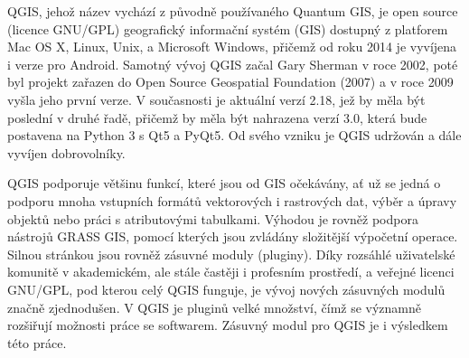 QGIS, jehož název vychází z původně používaného Quantum GIS, je open
source (licence GNU/GPL) geografický informační systém (GIS) dostupný
z platforem Mac OS X, Linux, Unix, a Microsoft Windows, přičemž od
roku 2014 je vyvíjena i verze pro Android. Samotný vývoj QGIS začal
Gary Sherman v roce 2002, poté byl projekt zařazen do Open Source
Geospatial Foundation (2007) a v roce 2009 vyšla jeho první verze. V
současnosti je aktuální verzí 2.18, jež by měla být poslední v druhé
řadě, přičemž by měla být nahrazena verzí 3.0, která bude postavena na
Python 3 s Qt5 a PyQt5. Od svého vzniku je QGIS udržován a dále
vyvíjen dobrovolníky.

QGIS podporuje většinu funkcí, které jsou od GIS očekávány, ať už se
jedná o podporu mnoha vstupních formátů vektorových i rastrových dat,
výběr a úpravy objektů nebo práci s atributovými tabulkami. Výhodou je
rovněž podpora nástrojů GRASS GIS, pomocí kterých jsou zvládány
složitější výpočetní operace.  Silnou stránkou jsou rovněž zásuvné
moduly (pluginy). Díky rozsáhlé uživatelské komunitě v akademickém,
ale stále častěji i profesním prostředí, a veřejné licenci GNU/GPL,
pod kterou celý QGIS funguje, je vývoj nových zásuvných modulů značně
zjednodušen. V QGIS je pluginů velké množství, čímž se významně
rozšiřují možnosti práce se softwarem. Zásuvný modul pro QGIS je i
výsledkem této práce.\cite{masteringQgis}
